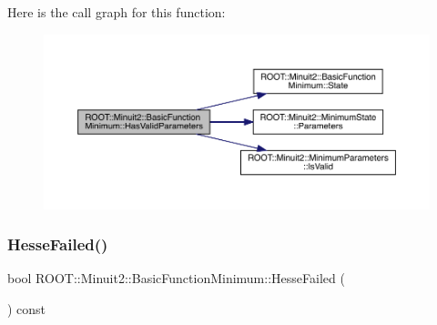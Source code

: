 Here is the call graph for this function\+:
\nopagebreak
\begin{figure}[H]
\begin{center}
\leavevmode
\includegraphics[width=350pt]{de/d25/classROOT_1_1Minuit2_1_1BasicFunctionMinimum_a91fedd04974dd5d27981eb758405670f_cgraph}
\end{center}
\end{figure}
\mbox{\label{classROOT_1_1Minuit2_1_1BasicFunctionMinimum_a8bcb47393d7e39ec1c8fda42974d092f}} 
\subsubsection{\texorpdfstring{HesseFailed()}{HesseFailed()}\hspace{0.1cm}{\footnotesize\ttfamily [1/2]}}
{\footnotesize\ttfamily bool R\+O\+O\+T\+::\+Minuit2\+::\+Basic\+Function\+Minimum\+::\+Hesse\+Failed (\begin{DoxyParamCaption}{ }\end{DoxyParamCaption}) const\hspace{0.3cm}{\ttfamily [inline]}}

